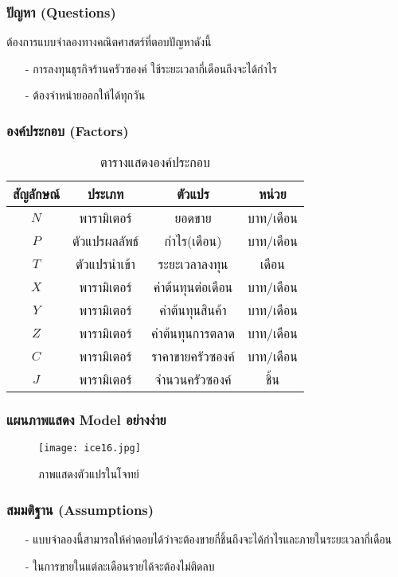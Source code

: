 \documentclass{beamer}
\begin{document}
\begin{frame}
\frametitle{ปัญหา (Questions)}
ต้องการแบบจำลองทางคณิตศาสตร์ที่ตอบปัญหาดังนี้
\begin{itemize}
    \item[-] การลงทุนธุรกิจร้านครัวซองค์ ใช้ระยะเวลากี่เดือนถึงจะได้กำไร
	\item[-] ต้องจำหน่ายออกให้ได้ทุกวัน
\end{itemize}
\end{frame}

\begin{frame}
\frametitle{องค์ประกอบ (Factors)}
\begin{center}
\begin{table}[!ht]
\centering
\begin{tabular}{ |c|c|c|c| }
\hline
\textbf{สัญลักษณ์ } & \textbf{ประเภท } & \textbf{ตัวแปร } & \textbf{หน่วย } \\
\hline
$N$ & พารามิเตอร์ & ยอดขาย & บาท/เดือน \\
\hline
$P$ & ตัวแปรผลลัพธ์ & กําไร(เดือน) & บาท/เดือน \\
\hline
$T$ & ตัวแปรนำเข้า & ระยะเวลาลงทุน & เดือน \\
\hline
$X$ & พารามิเตอร์ & ค่าต้นทุนต่อเดือน & บาท/เดือน \\
\hline
$Y$ & พารามิเตอร์ & ค่าต้นทุนสินค้า & บาท/เดือน \\
\hline
$Z$ & พารามิเตอร์ & ค่าต้นทุนการตลาด & บาท/เดือน \\
\hline
$C$ & พารามิเตอร์ & ราคาขายครัวซองค์ & บาท/เดือน \\
\hline
$J$ & พารามิเตอร์ & จํานวนครัวซองค์ & ชิ้น \\
\hline
\end{tabular}
\caption{ตารางแสดงองค์ประกอบ}
\label{table : 1}
\end{table}
\end{center}
\end{frame}

\begin{frame}
\frametitle{แผนภาพแสดง Model อย่างง่าย}
\begin{figure}[!ht]
	\centering
	\texttt{[image: ice16.jpg]}
	\caption{ภาพแสดงตัวแปรในโจทย์}
	\label{fig : graph2}
\end{figure}
\end{frame}

\begin{frame}
\frametitle{สมมติฐาน (Assumptions)}
\begin{itemize}
	\item[-] แบบจําลองนี้สามารถให้คําตอบได้ว่าจะต้องขายกี่ชิ้นถึงจะได้กําไรและภายในระยะเวลากี่เดือน
	\item[-] ในการขายในแต่ละเดือนรายได้จะต้องไม่ติดลบ
\end{itemize}
\end{frame}
\end{document}
